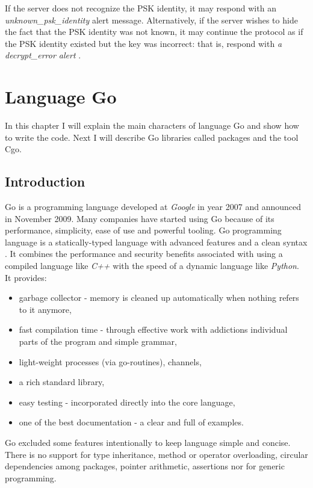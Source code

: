 \documentclass[
  twoside, 12pt, 
  printed, %
  notable,   %
  lof,     %
  lot,     %
]{fithesis3}
\begin{document}
If the server does not recognize the PSK identity, it may respond with an 
\textit{unknown\_psk\_identity} alert message.  Alternatively, if the server wishes to hide 
the fact that the PSK identity was not known, it may continue the protocol as if the PSK 
identity existed but the key was incorrect: that is, respond with \textit{a decrypt\_error 
alert} \cite{eronen2005pre}. 

\chapter{Language Go}\label{go}
In this chapter I will explain the main characters of language Go and show how to write the 
code. Next I will describe Go libraries called packages and the tool Cgo.

\section{Introduction}
Go is a programming language developed at \textit{Google} in year 2007 and announced in 
November 2009. Many companies have started using Go because of its performance, simplicity, 
ease of use and powerful tooling. Go programming language is a statically-typed language with 
advanced features and a clean syntax \cite{doxsey2016introducing}. It combines the performance 
and security benefits associated with using a compiled language like \textit{C++} with the 
speed of a dynamic language like \textit{Python}. It provides:
\vskip0.1in
\begin{itemize}[leftmargin=2em,rightmargin=1em,itemsep=0.75\parskip,parsep=0em,topsep=0em,partopsep=0em]
\item garbage collector - memory is cleaned up automatically when nothing refers to it 
anymore,
\item fast compilation time - through effective work with addictions individual parts of the 
program and simple grammar,
\item light-weight processes (via go-routines), channels,
\item a rich standard library,
\item easy testing - incorporated directly into the core language,
\item one of the best documentation - a clear and full of examples.
\end{itemize}
\vskip0.1in

Go excluded some features intentionally to keep language simple and concise. There is no 
support for type inheritance, method or operator overloading, circular dependencies among 
packages, pointer arithmetic, assertions nor for generic programming.
\nocite{wiki-go}
\nocite{doxsey2016introducing}
\end{document}

